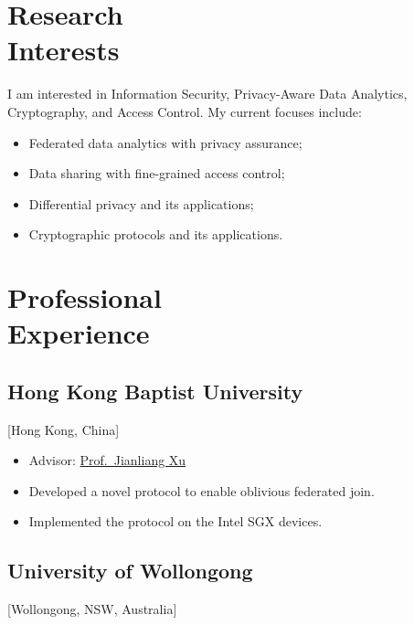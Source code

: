 \documentclass{mycv}
\begin{document}
\maketitle%

\section{Research \\ Interests}

I am interested in Information Security, Privacy-Aware Data Analytics, Cryptography, and Access Control. My current focuses include:

\begin{itemize}
  \item Federated data analytics with privacy assurance;
  \item Data sharing with fine-grained access control;
  \item Differential privacy and its applications;
  \item Cryptographic protocols and its applications.
\end{itemize}

\section{Professional \\ Experience}

\subsection{Hong Kong Baptist University}[Hong Kong, China]
\begin{positions}
\end{positions}

\begin{itemize}
  \item Advisor: \href{https://www.comp.hkbu.edu.hk/~xujl}{Prof.~Jianliang Xu}
  \item Developed a novel protocol to enable oblivious federated join.
  \item Implemented the protocol on the Intel SGX devices.
\end{itemize}

\subsection{University of Wollongong}[Wollongong, NSW, Australia]
\begin{positions}
\end{positions}
\end{document}
